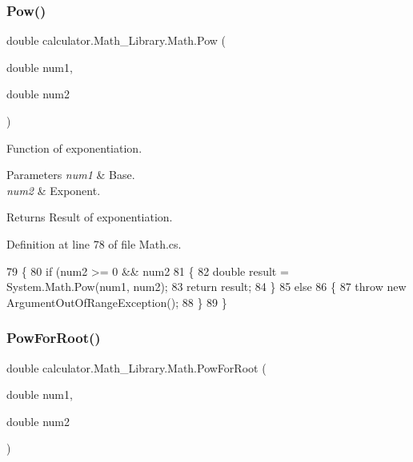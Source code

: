 \subsubsection{Pow()}
{\footnotesize\ttfamily double calculator.\+Math\+\_\+\+Library.\+Math.\+Pow (\begin{DoxyParamCaption}\item[{double}]{num1,  }\item[{double}]{num2 }\end{DoxyParamCaption})}



Function of exponentiation. 


\begin{DoxyParams}{Parameters}
{\em num1} & Base.\\
\hline
{\em num2} & Exponent.\\
\hline
\end{DoxyParams}
\begin{DoxyReturn}{Returns}
Result of exponentiation.
\end{DoxyReturn}


Definition at line 78 of file Math.\+cs.


\begin{DoxyCode}
79         \{
80             \textcolor{keywordflow}{if} (num2 >= 0 && num2 %
81             \{
82                 \textcolor{keywordtype}{double} result = System.Math.Pow(num1, num2);
83                 \textcolor{keywordflow}{return} result;
84             \}
85             \textcolor{keywordflow}{else}
86             \{
87                 \textcolor{keywordflow}{throw} \textcolor{keyword}{new} ArgumentOutOfRangeException();
88             \}
89         \}
\end{DoxyCode}
\mbox{\label{classcalculator_1_1_math___library_1_1_math_ab54a6f914803921d51a360404361aa53}} 
\subsubsection{Pow\+For\+Root()}
{\footnotesize\ttfamily double calculator.\+Math\+\_\+\+Library.\+Math.\+Pow\+For\+Root (\begin{DoxyParamCaption}\item[{double}]{num1,  }\item[{double}]{num2 }\end{DoxyParamCaption})}



